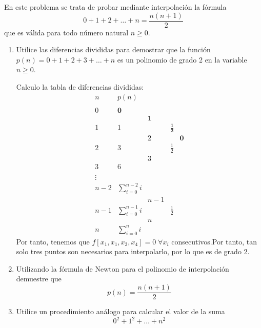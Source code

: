 \begin{ejercicio}
    En este problema se trata de probar mediante interpolación la fórmula
    \begin{equation*}
        0+1+2+\dots+n = \frac{n(n+1)}{2}
    \end{equation*}
    que es válida para todo número natural $n\geq 0$.
    
    \begin{enumerate}
        \item Utilice las diferencias divididas para demostrar que la función $p(n) = 0 + 1 + 2 + 3 + \dots + n$ es un polinomio de grado 2 en la variable $n \geq 0$.
        
        Calculo la tabla de diferencias divididas:
        \begin{equation*}
            \begin{array}{c|ccccccc}
                n & p(n) \\
                \\
                0 & \textbf{0} \\
                && \textbf{1}\\
                1 & 1 && \mathbf{\frac{1}{2}}\\
                && 2&&\textbf{0}\\
                2 & 3 && \frac{1}{2}\\
                && 3 &&\\
                3 & 6\\
                && \\
                \vdots & \\
                n-2 & \sum_{i=0}^{n-2}i\\
                && n-1\\
                n-1 & \sum_{i=0}^{n-1}i && \frac{1}{2}\\
                && n\\
                n & \sum_{i=0}^{n}i
            \end{array}
        \end{equation*}
        Por tanto, tenemos que $f[x_1, x_1, x_3, x_4]=0\;\forall x_i$ consecutivos.Por tanto, tan solo tres puntos son necesarios para interpolarlo, por lo que es de grado 2.

        \item Utilizando la fórmula de Newton para el polinomio de interpolación demuestre que
        \begin{equation*}
            p(n) = \frac{n(n+1)}{2}
        \end{equation*}

        \item Utilice un procedimiento análogo para calcular el valor de la suma
        \begin{equation*}
            0^2 + 1^2 + \dots + n^2
        \end{equation*}
    \end{enumerate}
\end{ejercicio}

